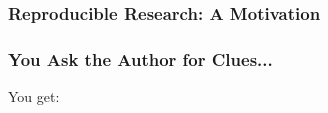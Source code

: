 \begin{frame}

  \frametitle{Reproducible Research: A Motivation}

  \begin{center}
    \hspace{1em}%
    \vspace{1em}
  \end{center}

\end{frame}


\begin{frame}

  \frametitle{You Ask the Author for Clues...}

  You get:


\end{frame}


